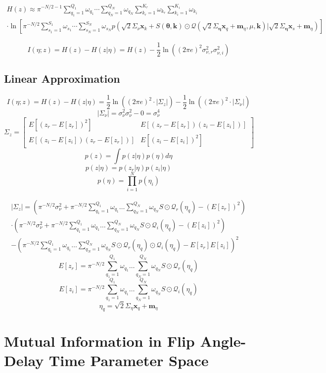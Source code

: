 \documentclass{article}         %
\theoremstyle{definition}
\theoremstyle{remark}
\newcommand{\eq}[1]{\begin{equation} #1 \end{equation}}
\newcommand{\ml}[1]{\begin{multline} #1 \end{multline}}
\newcommand{\paren}[1]{\left(#1\right)}
\newcommand{\bracket}[1]{\left[#1\right]}
\newcommand{\arr}[2]{\begin{array}{#1} #2 \end{array}}
\newcommand{\brkarray}[2]{\bracket{\arr{#1}{#2}}}
\begin{document}
\ml{H(z)\approx\pi^{-N/2-1}\sum\limits_{q_1=1}^{Q_1}\omega_{q_1}\cdots\sum\limits_{q_N=1}^{Q_N}\omega_{q_N}\sum\limits_{k_r=1}^{K_r}\omega_{k_r}\sum\limits_{k_i=1}^{K_i}\omega_{k_i}\\
\cdot\ln\left[\pi^{-N/2}\sum\limits_{s_1=1}^{S_1}\omega_{s_1}\cdots\sum\limits_{s_N=1}^{S_N}\omega_{s_N}p(\sqrt{2}\Sigma_\nu\mathbf{x}_k+S(\mathbf{\theta},\mathbf{k})\odot\mathcal{Q}(\sqrt{2}\Sigma_{\mathbf{\eta}}\mathbf{x}_q+\mathbf{m}_\eta,\mu,\mathbf{k})|\sqrt{2}\Sigma_{\mathbf{\eta}}\mathbf{x}_s+\mathbf{m}_\eta)\right]}

\eq{I(\eta;z)=H(z)-H(z|\eta)=H(z)-\frac{1}{2}\ln\left((2\pi e)^2\sigma_{\nu,r}^2\sigma_{\nu,i}^2\right)}

\subsection{Linear Approximation}

\eq{I(\eta;z)=H(z)-H(z|\eta)=\frac{1}{2}\ln\paren{(2\pi e)^2\cdot|\Sigma_z|}-\frac{1}{2}\ln\paren{(2\pi e)^2\cdot|\Sigma_\nu|}}
\eq{|\Sigma_\nu|=\sigma_\nu^2\sigma_\nu^2-0=\sigma_\nu^4}
\eq{\Sigma_z=\brkarray{cc}{E\left[(z_r-E[z_r])^2\right] & E\left[(z_r-E[z_r])(z_i-E[z_i])\right] \\ E\left[(z_i-E[z_i])(z_r-E[z_r])\right] & E\left[(z_i-E[z_i])^2\right]}}
\eq{p(z)=\int p(z|\eta)p(\eta)d\eta}
\eq{p(z|\eta)=p(z_r|\eta)p(z_i|\eta)}
\eq{p(\eta)=\prod\limits_{i=1}^N p(\eta_i)}

\ml{|\Sigma_z|=\paren{\pi^{-N/2}\sigma_\nu^2+\pi^{-N/2}\sum\limits_{q_1=1}^{Q_1}\omega_{q_1}\hdots\sum\limits_{q_N=1}^{Q_N}\omega_{q_N}S\odot\mathcal{Q}_r(\eta_q)-(E[z_r])^2}\\
\cdot\paren{\pi^{-N/2}\sigma_\nu^2+\pi^{-N/2}\sum\limits_{q_1=1}^{Q_1}\omega_{q_1}\hdots\sum\limits_{q_N=1}^{Q_N}\omega_{q_N}S\odot\mathcal{Q}_i(\eta_q)-(E[z_i])^2}\\
-\paren{\pi^{-N/2}\sum\limits_{q_1=1}^{Q_1}\omega_{q_1}\hdots\sum\limits_{q_N=1}^{Q_N}\omega_{q_N}S\odot\mathcal{Q}_r(\eta_q)\odot\mathcal{Q}_i(\eta_q)-E[z_r]E[z_i]}^2}
\eq{E[z_r]=\pi^{-N/2}\sum\limits_{q_1=1}^{Q_1}\omega_{q_1}\hdots\sum\limits_{q_N=1}^{Q_N}\omega_{q_N}S\odot\mathcal{Q}_r(\eta_q)}
\eq{E[z_i]=\pi^{-N/2}\sum\limits_{q_1=1}^{Q_1}\omega_{q_1}\hdots\sum\limits_{q_N=1}^{Q_N}\omega_{q_N}S\odot\mathcal{Q}_i(\eta_q)}
\eq{\eta_q=\sqrt{2}\Sigma_\eta\mathbf{x}_q+\mathbf{m}_\eta}

\section{Mutual Information in Flip Angle-Delay Time Parameter Space}
\end{document}
